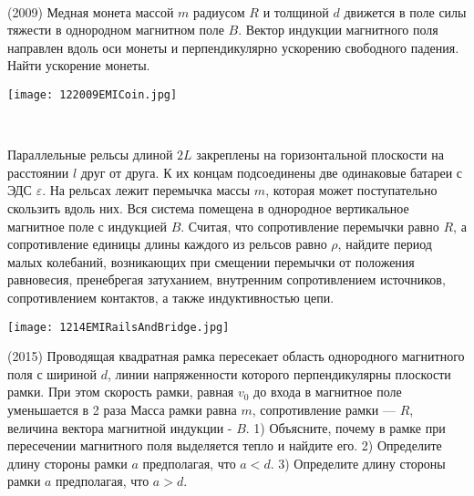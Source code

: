 \begin{ex}
\hspace{0pt} \\
\begin{minipage}{.65\textwidth}
(2009) Медная монета массой $m$ радиусом $R$ и толщиной $d$ движется в поле силы тяжести в однородном магнитном поле $B$. 
Вектор индукции магнитного поля направлен вдоль оси монеты и перпендикулярно ускорению свободного падения. Найти ускорение монеты.
\end{minipage}
\begin{minipage}{.35\textwidth}
\centering
\texttt{[image: 122009EMICoin.jpg]}
\end{minipage}
\begin{ans}
\end{ans}
\end{ex}

\begin{ex}
\hspace{0pt} \\
\begin{minipage}{.65\textwidth}
Параллельные рельсы длиной $2L$ закреплены на горизонтальной плоскости на расстоянии $l$ друг от друга. 
К их концам подсоединены две одинаковые батареи с ЭДС {\Large $\varepsilon$}. На рельсах лежит перемычка массы $m$, 
которая может поступательно скользить вдоль них. Вся система помещена в однородное вертикальное магнитное поле с индукцией $B$. 
Считая, что сопротивление перемычки равно $R$, а сопротивление единицы длины каждого из рельсов равно $\rho$, найдите период малых колебаний, возникающих при смещении перемычки от положения равновесия, пренебрегая затуханием, внутренним сопротивлением источников, сопротивлением контактов, а также индуктивностью цепи.
\end{minipage}
\begin{minipage}{.35\textwidth}
\centering
\texttt{[image: 1214EMIRailsAndBridge.jpg]}
\end{minipage}
\begin{ans}
\end{ans}
\end{ex}

\begin{ex}
(2015) Проводящая квадратная рамка пересекает область однородного магнитного поля с шириной $d$, линии напряженности которого перпендикулярны плоскости рамки. При этом скорость рамки, равная $v_0$ до входа в магнитное поле уменьшается в 2 раза Масса рамки равна $m$, сопротивление рамки — $R$, величина вектора магнитной индукции - $B$. 1) Объясните, почему в рамке при пересечении магнитного поля выделяется тепло и найдите его. 2) Определите длину стороны рамки $a$ предполагая, что $a<d$. 3) Определите длину стороны рамки $a$ предполагая, что $a>d$.
\begin{ans}
\end{ans}
\end{ex}